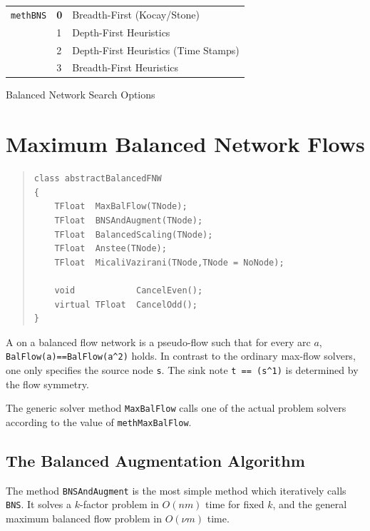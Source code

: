 \documentclass[a4paper,11pt,twoside]{book}
\begin{document}
\begin{multicols}{2}
\begin{tablehere}
\begin{center}
\vspace*{1cm}
\begin{tabular}{|l|l|l|}
\hline
\verb/methBNS/      & {\bf 0} & Breadth-First (Kocay/Stone) \\
                    & 1 & Depth-First Heuristics \\
                    & 2 & Depth-First Heuristics (Time Stamps) \\
                    & 3 & Breadth-First Heuristics \\
\hline
\end{tabular}
\end{center}
\caption{\label{tlb705}Balanced Network Search Options}
\end{tablehere}



\section{Maximum Balanced Network Flows}
\label{slb_solve_balanced_flow}
\methods
\begin{quote}
\begin{verbatim}
class abstractBalancedFNW
{
    TFloat  MaxBalFlow(TNode);
    TFloat  BNSAndAugment(TNode);
    TFloat  BalancedScaling(TNode);
    TFloat  Anstee(TNode);
    TFloat  MicaliVazirani(TNode,TNode = NoNode);

    void            CancelEven();
    virtual TFloat  CancelOdd();
}
\end{verbatim}
\end{quote}
A  on a balanced flow network is a pseudo-flow such
that for every arc $a$, \verb/BalFlow(a)==BalFlow(a^2)/ holds. In contrast to
the ordinary max-flow solvers, one only specifies the source node \verb/s/.
The sink note \verb/t == (s^1)/ is determined by the flow symmetry.

The generic solver method \verb/MaxBalFlow/ calls one of the actual problem
solvers according to the value of \verb/methMaxBalFlow/.


\subsection{The Balanced Augmentation Algorithm}
The method \verb/BNSAndAugment/ is the most simple method which iteratively
calls \verb/BNS/. It solves a $k$-factor problem in $O(nm)$ time for fixed $k$,
and the general maximum balanced flow problem in $O(\nu m)$ time. 



\end{multicols}
\end{document}
